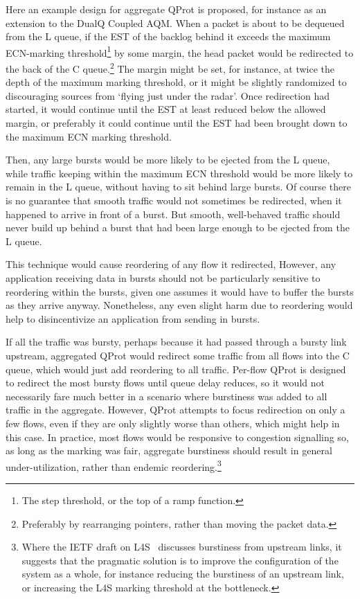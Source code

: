 Here an example design for aggregate QProt is proposed, for instance as an extension to the DualQ Coupled AQM. When a packet is about to be dequeued from the L queue, if the EST of the backlog behind it exceeds the maximum ECN-marking threshold\footnote{The step threshold, or the top of a ramp function.} by some margin, the head packet would be redirected to the back of the C queue.\footnote{Preferably by rearranging pointers, rather than moving the packet data.} The margin might be set, for instance, at twice the depth of the maximum marking threshold, or it might be slightly randomized to discouraging sources from `flying just under the radar'. Once redirection had started, it would continue until the EST at least reduced below the allowed margin, or preferably it could continue until the EST had been brought down to the maximum ECN marking threshold. 

Then, any large bursts would be more likely to be ejected from the L queue, while traffic keeping within the maximum ECN threshold would be more likely to remain in the L queue, without having to sit behind large bursts. Of course there is no guarantee that smooth traffic would not sometimes be redirected, when it happened to arrive in front of a burst. But smooth, well-behaved traffic should never build up behind a burst that had been large enough to be ejected from the L queue.

This technique would cause reordering of any flow it redirected, However, any application receiving data in bursts should not be particularly sensitive to reordering within the bursts, given one assumes it would have to buffer the bursts as they arrive anyway. Nonetheless, any even slight harm due to reordering would help to disincentivize an application from sending in bursts.

If all the traffic was bursty, perhaps because it had passed through a bursty link upstream, aggregated QProt would redirect some traffic from all flows into the C queue, which would just add reordering to all traffic. Per-flow QProt is designed to redirect the most bursty flows until queue delay reduces, so it would not necessarily fare much better in a scenario where burstiness was added to all traffic in the aggregate. However, QProt attempts to focus redirection on only a few flows, even if they are only slightly worse than others, which might help in this case. In practice, most flows would be responsive to congestion signalling so, as long as the marking was fair, aggregate burstiness should result in general under-utilization, rather than endemic reordering.\footnote{Where the IETF draft on L4S~\cite{Briscoe15f:ecn-l4s-id_ID} discusses burstiness from upstream links, it suggests that the pragmatic solution is to improve the configuration of the system as a whole, for instance reducing the burstiness of an upstream link, or increasing the L4S marking threshold at the bottleneck.}

